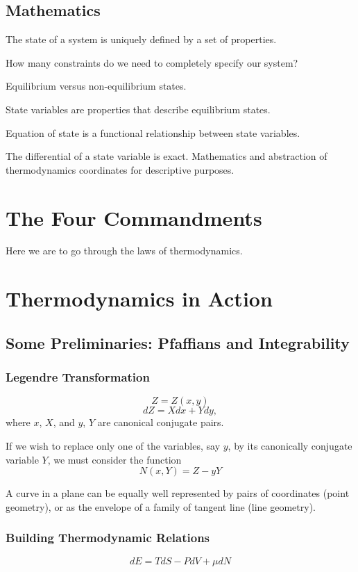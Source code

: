 \documentclass[10pt,twoside,openright]{memoir}
\begin{document}
\section{Mathematics}

The state of a system is uniquely defined by a set of properties. 

How many constraints do we need to completely specify our system?

Equilibrium versus non-equilibrium states.

State variables are properties that describe equilibrium states.

Equation of state is a functional relationship between state variables.

The differential of a state variable is exact. 
Mathematics and abstraction of thermodynamics coordinates for descriptive purposes.


\chapter{The Four Commandments}
Here we are to go through the laws of thermodynamics.


\chapter{Thermodynamics in Action}


\section{\label{sec:level1} Some Preliminaries: Pfaffians and Integrability}

\subsection{Legendre Transformation}
$$
Z = Z \left( x,y \right)
$$
$$
dZ = Xdx + Ydy,
$$
where $x$, $X$, and $y$, $Y$ are canonical conjugate pairs.

If we wish to replace only one of the variables, say $y$, by its canonically conjugate variable $Y$, we must consider the function
$$
N \left( x, Y \right) = Z - yY
$$

A curve in a plane can be equally well represented by pairs of coordinates (point geometry), or as the envelope of a family of tangent line (line geometry).

\subsection{Building Thermodynamic Relations}
$$
dE = TdS - PdV + \mu dN
$$
\end{document}
